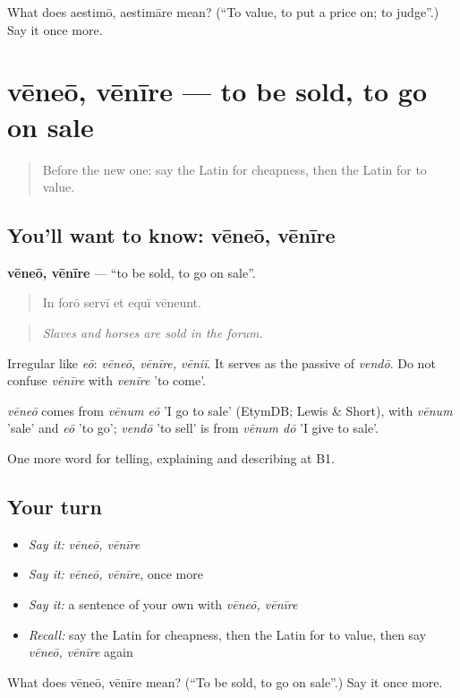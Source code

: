 \begin{tcolorbox}[breakable,colback=teal!4,colframe=teal!35!black,title={Before you move on}]
What does aestimō, aestimāre mean? (\textquotedblleft{}To value, to put a price on; to judge\textquotedblright{}.) Say it once more.
\end{tcolorbox}
\section[vēneō, vēnīre]{vēneō, vēnīre — to be sold, to go on sale}

\label{lesson:LA-C466-veneo}



\begin{quote}
Before the new one: say the Latin for cheapness, then the Latin for to value.
\end{quote}

\subsection*{You'll want to know: vēneō, vēnīre}
\textbf{vēneō, vēnīre} — \textquotedblleft{}to be sold, to go on sale\textquotedblright{}.

\begin{quote}
In forō servī et equī vēneunt.
\end{quote}

\begin{quote}
\emph{Slaves and horses are sold in the forum.}
\end{quote}

Irregular like \emph{eō}: \emph{vēneō, vēnīre, vēniī}. It serves as the passive of \emph{vendō}. Do not confuse \emph{vēnīre} with \emph{venīre} 'to come'.

\begin{cousinweb}
\emph{vēneō} comes from \emph{vēnum eō} 'I go to sale' (EtymDB; Lewis \& Short), with \emph{vēnum} 'sale' and \emph{eō} 'to go'; \emph{vendō} 'to sell' is from \emph{vēnum dō} 'I give to sale'.
\end{cousinweb}

\begin{grammarlens}[title={What you've built}]
One more word for telling, explaining and describing at B1.
\end{grammarlens}

\subsection*{Your turn}
\begin{itemize}
\raggedright
  \item \emph{Say it:} \emph{vēneō, vēnīre}
  \item \emph{Say it:} \emph{vēneō, vēnīre}, once more
  \item \emph{Say it:} a sentence of your own with \emph{vēneō, vēnīre}
  \item \emph{Recall:} say the Latin for cheapness, then the Latin for to value, then say \emph{vēneō, vēnīre} again
\end{itemize}

\begin{tcolorbox}[breakable,colback=teal!4,colframe=teal!35!black,title={Before you move on}]
What does vēneō, vēnīre mean? (\textquotedblleft{}To be sold, to go on sale\textquotedblright{}.) Say it once more.
\end{tcolorbox}
